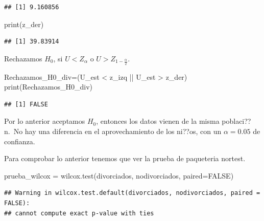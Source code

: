 \documentclass[
]{article}
\newenvironment{Shaded}{\begin{snugshade}}{\end{snugshade}}
\newcommand{\AttributeTok}[1]{\textcolor[rgb]{0.77,0.63,0.00}{#1}}
\newcommand{\ConstantTok}[1]{\textcolor[rgb]{0.00,0.00,0.00}{#1}}
\newcommand{\FunctionTok}[1]{\textcolor[rgb]{0.00,0.00,0.00}{#1}}
\newcommand{\NormalTok}[1]{#1}
\newcommand{\OtherTok}[1]{\textcolor[rgb]{0.56,0.35,0.01}{#1}}
\newcommand{\SpecialCharTok}[1]{\textcolor[rgb]{0.00,0.00,0.00}{#1}}
\begin{document}
\begin{verbatim}
## [1] 9.160856
\end{verbatim}

\begin{Shaded}
\begin{Highlighting}[]
\FunctionTok{print}\NormalTok{(z\_der)}
\end{Highlighting}
\end{Shaded}

\begin{verbatim}
## [1] 39.83914
\end{verbatim}

Rechazamos \(H_{0}\), si \(U< Z_{\alpha}\) o
\(U> Z_{1-\frac{\alpha}{2}}\).

\begin{Shaded}
\begin{Highlighting}[]
\NormalTok{Rechazamos\_H0\_div}\OtherTok{=}\NormalTok{(U\_est }\SpecialCharTok{\textless{}}\NormalTok{ z\_izq }\SpecialCharTok{||}\NormalTok{ U\_est }\SpecialCharTok{\textgreater{}}\NormalTok{ z\_der)}
\FunctionTok{print}\NormalTok{(Rechazamos\_H0\_div)}
\end{Highlighting}
\end{Shaded}

\begin{verbatim}
## [1] FALSE
\end{verbatim}

Por lo anterior aceptamos \(H_{0}\), entonces los datos vienen de la
misma poblaci??n.~No hay una diferencia en el aprovechamiento de los
ni??os, con un \(\alpha=0.05\) de confianza.

Para comprobar lo anterior tenemos que ver la prueba de paqueteria
nortest.

\begin{Shaded}
\begin{Highlighting}[]
\NormalTok{prueba\_wilcox }\OtherTok{=} \FunctionTok{wilcox.test}\NormalTok{(divorciados, nodivorciados, }\AttributeTok{paired=}\ConstantTok{FALSE}\NormalTok{)}
\end{Highlighting}
\end{Shaded}

\begin{verbatim}
## Warning in wilcox.test.default(divorciados, nodivorciados, paired = FALSE):
## cannot compute exact p-value with ties
\end{verbatim}

\begin{Shaded}
\end{Shaded}
\end{document}
